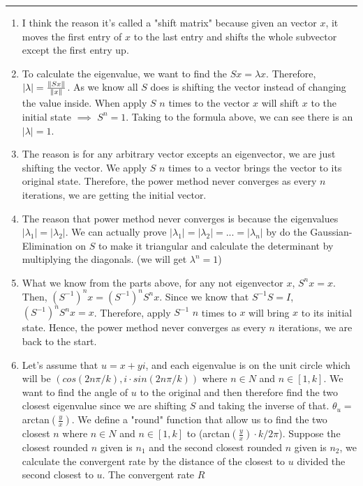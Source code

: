 \documentclass[11pt]{article}
\begin{document}





\begin{quote}

\end{quote}
\hrule


\begin{solution}
\item
    \begin{enumerate}
    \item  I think the reason it's called a "shift matrix" because given an vector $x$, it moves the first entry of $x$ to the last entry and shifts the whole subvector except the first entry up.  
    \item To calculate the eigenvalue, we want to find the $Sx = \lambda x$. Therefore, $|\lambda| = \frac{\mathopen\| Sx \mathclose\|}{\mathopen\| x \mathclose\|}$. As we know all $S$ does is shifting the vector instead of changing the value inside. When apply $S$ $n$ times to the vector $x$ will shift $x$ to the initial state $\implies$ $S^n = 1$. Taking to the formula above, we can see there is an $|\lambda| = 1$.
    \item The reason is for any arbitrary vector excepts an eigenvector, we are just shifting the vector. We apply $S$ $n$ times to a vector brings the vector to its original state. Therefore, the power method never converges as every $n$ iterations, we are getting the initial vector.
    \item The reason that power method never converges is because the eigenvalues $|\lambda_1| = |\lambda_2|$. We can actually prove $|\lambda_1| = |\lambda_2| = ... = |\lambda_n|$ by do the Gaussian-Elimination on $S$ to make it triangular and calculate the determinant by multiplying the diagonals. (we will get $\lambda^n = 1$)
    \item What we know from the parts above, for any not eigenvector $x$, $S^nx = x$. Then, $(S^{-1})^nx = (S^{-1})^nS^nx$. Since we know that $S^{-1}S = I$, $(S^{-1})^nS^nx = x$. Therefore, apply $S^{-1}$ $n$ times to $x$ will bring $x$ to its initial state. Hence, the power method never converges as every $n$ iterations, we are back to the start.
    \item Let's assume that $u = x + yi$, and each eigenvalue is on the unit circle which will be $(cos(2n\pi/k), i\cdot sin(2n\pi/k))$ where $n \in N$ and $n\in[1,k]$. We want to find the angle of $u$ to the original and then therefore find the two closest eigenvalue since we are shifting $S$ and taking the inverse of that. $\theta_u = $ arctan$(\frac{y}{x})$. We define a "round" function that allow us to find the two closest $n$ where $n \in N$ and $n\in[1,k]$ to (arctan$(\frac{y}{x})\cdot k/2\pi$). Suppose the closest rounded $n$ given is $n_1$ and the second closest rounded $n$ given is $n_2$, we calculate the convergent rate by the distance of the closest to $u$ divided the second closest to $u$. The convergent rate $R$

\end{enumerate}
\end{solution}
\end{document}
